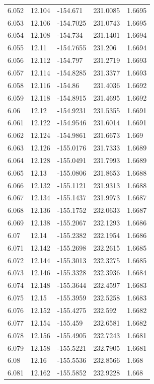 \begin{tabular}{lllll}
6.052 & 12.104 & -154.671 & 231.0085 & 1.6695 \\
6.053 & 12.106 & -154.7025 & 231.0743 & 1.6695 \\
6.054 & 12.108 & -154.734 & 231.1401 & 1.6694 \\
6.055 & 12.11 & -154.7655 & 231.206 & 1.6694 \\
6.056 & 12.112 & -154.797 & 231.2719 & 1.6693 \\
6.057 & 12.114 & -154.8285 & 231.3377 & 1.6693 \\
6.058 & 12.116 & -154.86 & 231.4036 & 1.6692 \\
6.059 & 12.118 & -154.8915 & 231.4695 & 1.6692 \\
6.06 & 12.12 & -154.9231 & 231.5355 & 1.6691 \\
6.061 & 12.122 & -154.9546 & 231.6014 & 1.6691 \\
6.062 & 12.124 & -154.9861 & 231.6673 & 1.669 \\
6.063 & 12.126 & -155.0176 & 231.7333 & 1.6689 \\
6.064 & 12.128 & -155.0491 & 231.7993 & 1.6689 \\
6.065 & 12.13 & -155.0806 & 231.8653 & 1.6688 \\
6.066 & 12.132 & -155.1121 & 231.9313 & 1.6688 \\
6.067 & 12.134 & -155.1437 & 231.9973 & 1.6687 \\
6.068 & 12.136 & -155.1752 & 232.0633 & 1.6687 \\
6.069 & 12.138 & -155.2067 & 232.1293 & 1.6686 \\
6.07 & 12.14 & -155.2382 & 232.1954 & 1.6686 \\
6.071 & 12.142 & -155.2698 & 232.2615 & 1.6685 \\
6.072 & 12.144 & -155.3013 & 232.3275 & 1.6685 \\
6.073 & 12.146 & -155.3328 & 232.3936 & 1.6684 \\
6.074 & 12.148 & -155.3644 & 232.4597 & 1.6683 \\
6.075 & 12.15 & -155.3959 & 232.5258 & 1.6683 \\
6.076 & 12.152 & -155.4275 & 232.592 & 1.6682 \\
6.077 & 12.154 & -155.459 & 232.6581 & 1.6682 \\
6.078 & 12.156 & -155.4905 & 232.7243 & 1.6681 \\
6.079 & 12.158 & -155.5221 & 232.7905 & 1.6681 \\
6.08 & 12.16 & -155.5536 & 232.8566 & 1.668 \\
6.081 & 12.162 & -155.5852 & 232.9228 & 1.668 \\

\end{tabular}
